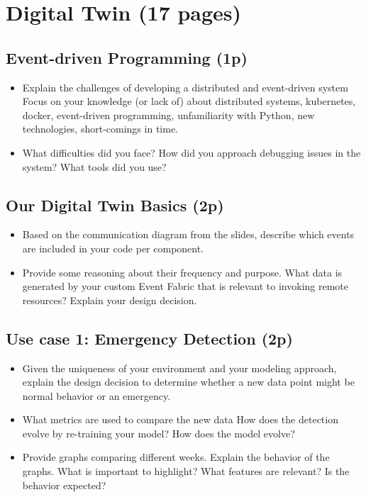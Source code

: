 \documentclass[A4,10pt]{article}
\begin{document}
\section{Digital Twin (17 pages)}

\subsection{Event-driven Programming (1p)}

\begin{itemize}
	\item Explain the challenges of developing a distributed and event-driven system Focus on your knowledge (or lack of) about distributed systems, kubernetes, docker, event-driven programming, unfamiliarity with Python, new technologies, short-comings in time.
	\item What difficulties did you face? How did you approach debugging issues in the system? What tools did you use?
\end{itemize}

\subsection{Our Digital Twin Basics (2p)}

\begin{itemize}
	\item Based on the communication diagram from the slides, describe which events are included in your code per component.
	\item Provide some reasoning about their frequency and purpose. What data is generated by your custom Event Fabric that is relevant to invoking remote resources? Explain your design decision.
\end{itemize}


\subsection{Use case 1: Emergency Detection (2p)}

\begin{itemize}
	\item Given the uniqueness of your environment and your modeling approach, explain the design decision to determine whether a new data point might be normal behavior or an emergency.
	\item What metrics are used to compare the new data How does the detection evolve by re-training your model? How does the model evolve?
	\item Provide graphs comparing different weeks. Explain the behavior of the graphs. What is important to highlight? What features are relevant? Is the behavior expected?
\end{itemize}
\end{document}

